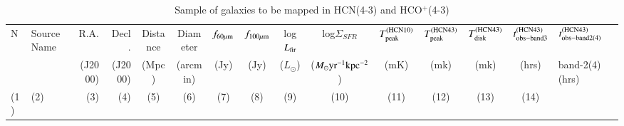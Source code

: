 \documentclass[legal,11pt]{article}
\begin{document}
\begin{table}
\caption{Sample of galaxies to be mapped in HCN(4-3) and HCO$^+$(4-3)}
\label{tbl:sample}
\centering
\scriptsize
\addtolength{\tabcolsep}{-4.5pt}

\begin{threeparttable}[b]
\begin{tabular}{llrrccccccccccl}
\hline
\hline

N & Source Name & R.A. & Decl. & Distance & Diameter & $f_{\rm 60\mu m}$ & $f_{\rm 100\mu m}$ & log$L_{\rm fir}$ & log$\Sigma_{SFR}$ & $T_{\rm peak}^{\rm (HCN10)}$ & $T_{\rm peak}^{\rm (HCN43)}$ & $T_{\rm disk}^{\rm (HCN43)}$  & $t_{\rm obs-band3}^{\rm (HCN43)}$ & $t_{\rm obs-band2(4)}^{\rm (HCN43)}$ \\

  &  & (J2000) & (J2000) & (Mpc) & (arcmin) & (Jy) & (Jy) & ($L_\odot$) & ($M_{\odot} \rm yr^{-1} kpc^{-2}$) & (mK) & (mk) & (mk) & (hrs) & band-2(4)(hrs) \\

(1) & (2)  & (3) & (4) & (5) & (6) & (7) & (8) & (9) & (10) & (11) & (12) & (13) & (14)  \\

\hline


\end{tabular}
\end{threeparttable}
\end{table}
\end{document}
